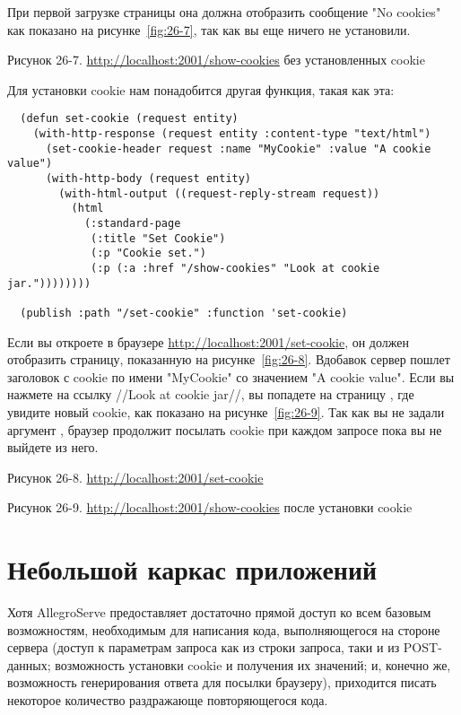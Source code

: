 При первой загрузке страницы  она должна
отобразить сообщение "No cookies" как показано на рисунке~\ref{fig:26-7}, так как вы еще ничего не
установили.

Рисунок 26-7. \url{http://localhost:2001/show-cookies} без установленных cookie

Для установки cookie нам понадобится другая функция, такая как эта:

\begin{lstlisting}
  (defun set-cookie (request entity)
    (with-http-response (request entity :content-type "text/html")
      (set-cookie-header request :name "MyCookie" :value "A cookie value")
      (with-http-body (request entity)
        (with-html-output ((request-reply-stream request))
          (html 
            (:standard-page
             (:title "Set Cookie")
             (:p "Cookie set.")
             (:p (:a :href "/show-cookies" "Look at cookie jar."))))))))

  (publish :path "/set-cookie" :function 'set-cookie)
\end{lstlisting}

Если вы откроете в браузере \url{http://localhost:2001/set-cookie}, он должен отобразить
страницу, показанную на рисунке~\ref{fig:26-8}. Вдобавок сервер пошлет заголовок
 с cookie по имени "MyCookie" со значением "A cookie value". Если вы
нажмете на ссылку //Look at cookie jar//, вы попадете на страницу ,
где увидите новый cookie, как показано на рисунке~\ref{fig:26-9}. Так как вы не задали
аргумент , браузер продолжит посылать cookie при каждом запросе пока вы не
выйдете из него.

Рисунок 26-8. \url{http://localhost:2001/set-cookie}

Рисунок 26-9. \url{http://localhost:2001/show-cookies} после установки cookie

\section{Небольшой каркас приложений}

Хотя AllegroServe предоставляет достаточно прямой доступ ко всем базовым возможностям,
необходимым для написания кода, выполняющегося на стороне сервера (доступ к параметрам
запроса как из строки запроса, таки и из POST-данных; возможность установки cookie и
получения их значений; и, конечно же, возможность генерирования ответа для посылки
браузеру), приходится писать некоторое количество раздражающе повторяющегося кода.

